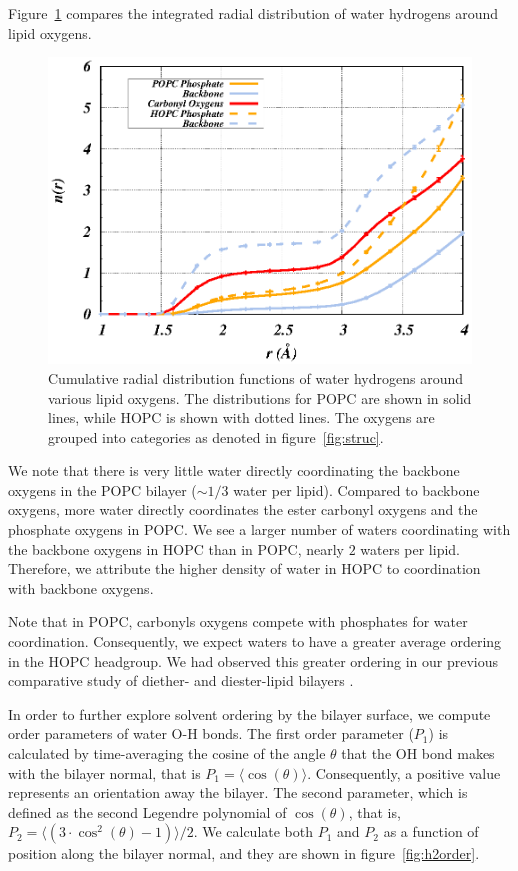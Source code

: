 \documentclass[12pt,openany,final]{book}
\newcommand{\about}{$\sim$}
\begin{document}
Figure~\ref{fig:hrdf} compares the integrated radial distribution of water hydrogens around lipid oxygens. 
\begin{figure}[p]
\caption[Cumulative radial distribution functions of water hydrogens around
various lipid oxygens.]{ 
Cumulative radial distribution functions of water hydrogens around
various lipid oxygens. The distributions for POPC are shown in solid lines, while HOPC is shown with dotted lines. 
The oxygens are grouped into categories as denoted in figure~\ref{fig:struc}.}
\label{fig:hrdf}
\includegraphics[width=\textwidth]{h_rdf_cum.eps}
\end{figure}
We note that there is very little water directly coordinating the backbone oxygens in the POPC bilayer (\about $1/3$ water per lipid). 
Compared to backbone oxygens, more water directly coordinates the ester carbonyl oxygens and the phosphate oxygens in POPC. 
We see a larger number of waters coordinating with the backbone oxygens in HOPC than in POPC, nearly $2$ waters per lipid.
Therefore, we attribute the higher density of water in HOPC to coordination with backbone oxygens. 

Note that in POPC, carbonyls oxygens compete with phosphates for water coordination. Consequently, we expect waters 
to have a greater average ordering in the HOPC headgroup. We had observed this greater ordering in our previous comparative study of 
diether- and diester-lipid bilayers \cite{kruczek:2017:ether}. 


In order to further explore solvent ordering by the bilayer surface, we compute order parameters of water O-H bonds.
The first order parameter ($P_1$) is calculated by time-averaging the cosine of 
the angle $\theta$ that the OH bond makes with the bilayer normal, 
that is $P_1 = \langle \cos(\theta) \rangle$. Consequently, a positive value represents an orientation 
away the bilayer. The second parameter, which is defined as the second Legendre polynomial of $\cos(\theta)$, that 
is, $P_2 = \langle (3 \cdot \cos^{2}(\theta)-1) \rangle/2$.  
We calculate both $P_1$ and $P_2$ as a function of position along the bilayer normal, and they are shown in figure~\ref{fig:h2order}. 
\end{document}
